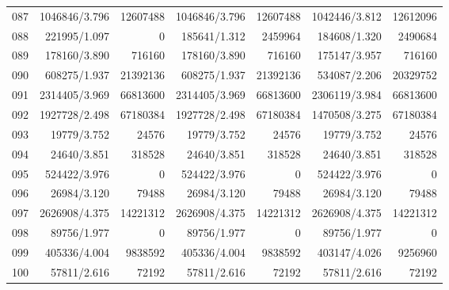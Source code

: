 \begin{longtable}{crrrrrr}
087 & 1046846/3.796 & 12607488 & 1046846/3.796 & 12607488 & 1042446/3.812 & 12612096 \\
088 & 221995/1.097 & 0 & 185641/1.312 & 2459964 & 184608/1.320 & 2490684 \\
089 & 178160/3.890 & 716160 & 178160/3.890 & 716160 & 175147/3.957 & 716160 \\
090 & 608275/1.937 & 21392136 & 608275/1.937 & 21392136 & 534087/2.206 & 20329752 \\
091 & 2314405/3.969 & 66813600 & 2314405/3.969 & 66813600 & 2306119/3.984 & 66813600 \\
092 & 1927728/2.498 & 67180384 & 1927728/2.498 & 67180384 & 1470508/3.275 & 67180384 \\
093 & 19779/3.752 & 24576 & 19779/3.752 & 24576 & 19779/3.752 & 24576 \\
094 & 24640/3.851 & 318528 & 24640/3.851 & 318528 & 24640/3.851 & 318528 \\
095 & 524422/3.976 & 0 & 524422/3.976 & 0 & 524422/3.976 & 0 \\
096 & 26984/3.120 & 79488 & 26984/3.120 & 79488 & 26984/3.120 & 79488 \\
097 & 2626908/4.375 & 14221312 & 2626908/4.375 & 14221312 & 2626908/4.375 & 14221312 \\
098 & 89756/1.977 & 0 & 89756/1.977 & 0 & 89756/1.977 & 0 \\
099 & 405336/4.004 & 9838592 & 405336/4.004 & 9838592 & 403147/4.026 & 9256960 \\
100 & 57811/2.616 & 72192 & 57811/2.616 & 72192 & 57811/2.616 & 72192 \\
\end{longtable}

